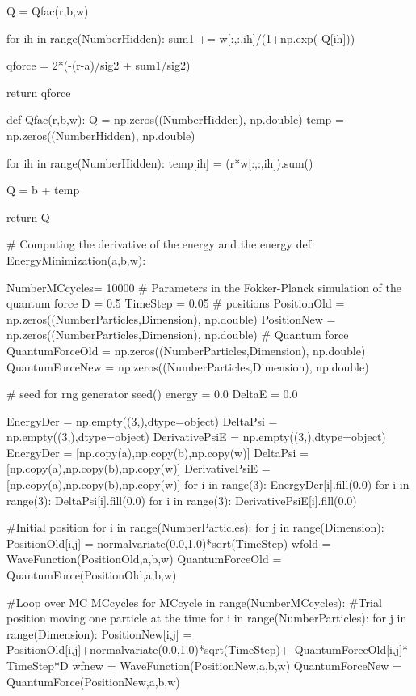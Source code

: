 \documentclass[%
oneside,                 %
final,                   %
10pt]{article}
\begin{document}
    Q = Qfac(r,b,w)
    
    for ih in range(NumberHidden):
        sum1 += w[:,:,ih]/(1+np.exp(-Q[ih]))
    
    qforce = 2*(-(r-a)/sig2 + sum1/sig2)
    
    return qforce
    
def Qfac(r,b,w):
    Q = np.zeros((NumberHidden), np.double)
    temp = np.zeros((NumberHidden), np.double)
    
    for ih in range(NumberHidden):
        temp[ih] = (r*w[:,:,ih]).sum()
        
    Q = b + temp
    
    return Q
    
# Computing the derivative of the energy and the energy 
def EnergyMinimization(a,b,w):

    NumberMCcycles= 10000
    # Parameters in the Fokker-Planck simulation of the quantum force
    D = 0.5
    TimeStep = 0.05
    # positions
    PositionOld = np.zeros((NumberParticles,Dimension), np.double)
    PositionNew = np.zeros((NumberParticles,Dimension), np.double)
    # Quantum force
    QuantumForceOld = np.zeros((NumberParticles,Dimension), np.double)
    QuantumForceNew = np.zeros((NumberParticles,Dimension), np.double)

    # seed for rng generator 
    seed()
    energy = 0.0
    DeltaE = 0.0

    EnergyDer = np.empty((3,),dtype=object)
    DeltaPsi = np.empty((3,),dtype=object)
    DerivativePsiE = np.empty((3,),dtype=object)
    EnergyDer = [np.copy(a),np.copy(b),np.copy(w)]
    DeltaPsi = [np.copy(a),np.copy(b),np.copy(w)]
    DerivativePsiE = [np.copy(a),np.copy(b),np.copy(w)]
    for i in range(3): EnergyDer[i].fill(0.0)
    for i in range(3): DeltaPsi[i].fill(0.0)
    for i in range(3): DerivativePsiE[i].fill(0.0)

    
    #Initial position
    for i in range(NumberParticles):
        for j in range(Dimension):
            PositionOld[i,j] = normalvariate(0.0,1.0)*sqrt(TimeStep)
    wfold = WaveFunction(PositionOld,a,b,w)
    QuantumForceOld = QuantumForce(PositionOld,a,b,w)

    #Loop over MC MCcycles
    for MCcycle in range(NumberMCcycles):
        #Trial position moving one particle at the time
        for i in range(NumberParticles):
            for j in range(Dimension):
                PositionNew[i,j] = PositionOld[i,j]+normalvariate(0.0,1.0)*sqrt(TimeStep)+\
                                       QuantumForceOld[i,j]*TimeStep*D
            wfnew = WaveFunction(PositionNew,a,b,w)
            QuantumForceNew = QuantumForce(PositionNew,a,b,w)
            
\end{document}
